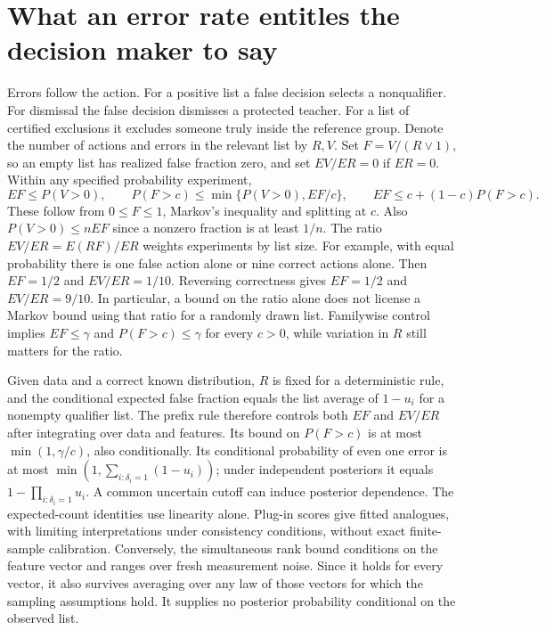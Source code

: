 \documentclass[11pt]{article}
\begin{document}
\section{What an error rate entitles the decision maker to say}
Errors follow the action. For a positive list a false decision selects a nonqualifier. For dismissal the false decision dismisses a protected teacher. For a list of certified exclusions it excludes someone truly inside the reference group. Denote the number of actions and errors in the relevant list by $R,V$. Set $F=V/(R\vee1)$, so an empty list has realized false fraction zero, and set $EV/ER=0$ if $ER=0$. Within any specified probability experiment,
\[
 E F\le P(V>0),\qquad
 P(F>c)\le\min\{P(V>0),EF/c\},\qquad
 EF\le c+(1-c)P(F>c).
\]
These follow from $0\le F\le1$, Markov's inequality and splitting at $c$. Also $P(V>0)\le nEF$ since a nonzero fraction is at least $1/n$. The ratio $EV/ER=E(RF)/ER$ weights experiments by list size. For example, with equal probability there is one false action alone or nine correct actions alone. Then $EF=1/2$ and $EV/ER=1/10$. Reversing correctness gives $EF=1/2$ and $EV/ER=9/10$. In particular, a bound on the ratio alone does not license a Markov bound using that ratio for a randomly drawn list. Familywise control implies $EF\le\gamma$ and $P(F>c)\le\gamma$ for every $c>0$, while variation in $R$ still matters for the ratio.

Given data and a correct known distribution, $R$ is fixed for a deterministic rule, and the conditional expected false fraction equals the list average of $1-u_i$ for a nonempty qualifier list. The prefix rule therefore controls both $EF$ and $EV/ER$ after integrating over data and features. Its bound on $P(F>c)$ is at most $\min(1,\gamma/c)$, also conditionally. Its conditional probability of even one error is at most $\min(1,\sum_{i:\delta_i=1}(1-u_i))$; under independent posteriors it equals $1-\prod_{i:\delta_i=1}u_i$. A common uncertain cutoff can induce posterior dependence. The expected-count identities use linearity alone. Plug-in scores give fitted analogues, with limiting interpretations under consistency conditions, without exact finite-sample calibration. Conversely, the simultaneous rank bound conditions on the feature vector and ranges over fresh measurement noise. Since it holds for every vector, it also survives averaging over any law of those vectors for which the sampling assumptions hold. It supplies no posterior probability conditional on the observed list.
\end{document}
